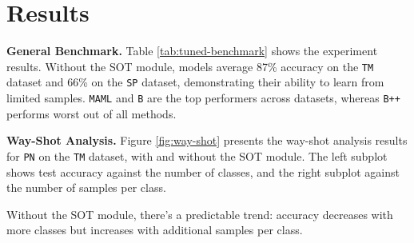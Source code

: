 \section{Results}


\textbf{General Benchmark.} Table \ref{tab:tuned-benchmark} shows the experiment results. Without the SOT module, models average 87\% accuracy on the \texttt{TM} dataset and 66\% on the \texttt{SP} dataset, demonstrating their ability to learn from limited samples. 
\texttt{MAML} and \texttt{B} are the top performers across datasets, whereas \texttt{B++} performs worst out of all methods.






\textbf{Way-Shot Analysis.} Figure \ref{fig:way-shot} presents the way-shot analysis results for \texttt{PN} on the \texttt{TM} dataset, with and without the SOT module. 
The left subplot shows test accuracy against the number of classes, and the right subplot against the number of samples per class.

Without the SOT module, there's a predictable trend: accuracy decreases with more classes but increases with additional samples per class. 

